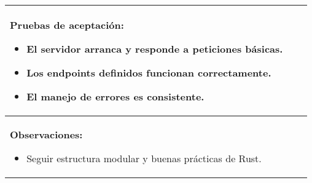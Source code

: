 \begin{table}[H]
\begin{center}
\begin{tabularx}{\textwidth}{|l|X|l|}
{                \textbf{Pruebas de aceptación:}
                    \begin{itemize}
                        \item El servidor arranca y responde a peticiones básicas.
                        \item Los endpoints definidos funcionan correctamente.
                        \item El manejo de errores es consistente.
                    \end{itemize}
            }\\
            \hline
            \multicolumn{3}{|p{\textwidth}|}{
                \textbf{Observaciones:}
                \begin{itemize}
                    \item Seguir estructura modular y buenas prácticas de Rust.
                \end{itemize}
            }\\
            \hline
        \end{tabularx}
    \end{center}
\end{table}

